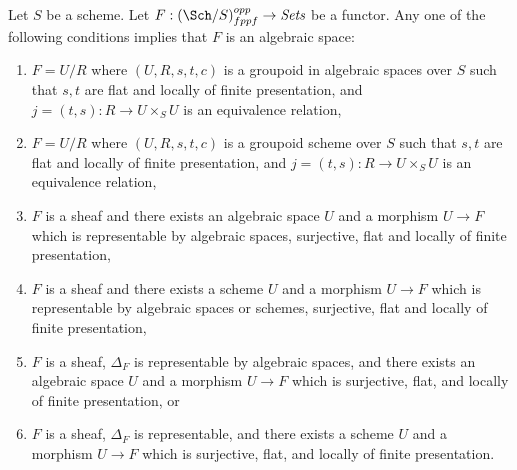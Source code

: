 \begin{theorem}
\label{theorem-final-bootstrap}
Let $S$ be a scheme.
Let $F : (\Sch/S)_{fppf}^{opp} \to \textit{Sets}$ be a functor.
Any one of the following conditions implies that $F$ is an algebraic space:
\begin{enumerate}
\item $F = U/R$ where $(U, R, s, t, c)$ is a groupoid in algebraic spaces
over $S$ such that $s, t$ are flat and locally of finite presentation, and
$j = (t, s) : R \to U \times_S U$ is an equivalence relation,
\item $F = U/R$ where $(U, R, s, t, c)$ is a groupoid scheme
over $S$ such that $s, t$ are flat and locally of finite presentation, and
$j = (t, s) : R \to U \times_S U$ is an equivalence relation,
\item $F$ is a sheaf and there exists an algebraic space $U$ and a morphism
$U \to F$ which is representable by algebraic spaces,
surjective, flat and locally of finite presentation,
\item $F$ is a sheaf and there exists a scheme $U$ and a morphism
$U \to F$ which is representable by algebraic spaces or schemes,
surjective, flat and locally of finite presentation,
\item $F$ is a sheaf, $\Delta_F$ is representable by algebraic spaces,
and there exists an algebraic space $U$ and a morphism $U \to F$ which is
surjective, flat, and locally of finite presentation, or
\item $F$ is a sheaf, $\Delta_F$ is representable,
and there exists a scheme $U$ and a morphism $U \to F$ which is
surjective, flat, and locally of finite presentation.
\end{enumerate}
\end{theorem}

